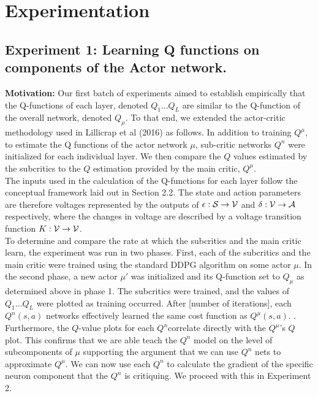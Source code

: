 \section{Experimentation}
\subsection{Experiment 1: Learning Q functions on components of the Actor network.}

\textbf{Motivation:}
Our first batch of experiments aimed to establish empirically that the Q-functions of each layer, denoted $Q_1...Q_L$ are similar to the Q-function of the overall network, denoted $Q_{\mu}$. To that end, we extended the actor-critic methodology used in Lillicrap et al (2016) as follows. In addition to training $Q^\mu$, to estimate the Q functions of the actor network $\mu$, sub-critic networks $Q^n$ were initialized for each individual layer. We then compare the $Q$ values estimated by the subcritics to the $Q$ estimation provided by the main critic, $Q^\mu$. \\
\newline
The inputs used in the calculation of the Q-functions for each layer follow the conceptual framework laid out in Section 2.2. The state and action parameters are therefore voltages represented by the outputs of $\epsilon : {\mathcal S} \to {\mathcal V}$ and $\delta : {\mathcal V} \to {\mathcal A}$ respectively, where the changes in voltage are described by a voltage transition function $K : {\mathcal V} \to {\mathcal V}$. \\
\newline
To determine and compare the rate at which the subcritics and the main critic learn, the experiment was run in two phases. First, each of the subcritics and the main critic were trained using the standard DDPG algorithm on some actor $\mu$. In the second phase, a new actor $\mu'$ was initialized and its Q-function set to $Q_{\mu}$ as determined above in phase 1. The subcritics were trained, and the values of $Q_1\dots Q_{L}$ were plotted as training occurred. 
\newline
After [number of iterations], each $Q^n(s,a)$  networks effectively learned the same cost function as $Q^{\mu}(s,a)$.
. Furthermore, the $Q$-value plots for each $Q^n$correlate directly with the  $Q^{\mu}$'s $Q$ plot. This confirms that we are able teach the $Q^n$ model on the level of subcomponents of $\mu$ supporting the argument that we can use $Q^n$ nets to approximate $Q^\mu$. We can now use each $Q^n$ to calculate the gradient of the specific neuron component that the $Q^n$ is critiquing. We proceed with this in Experiment 2.
